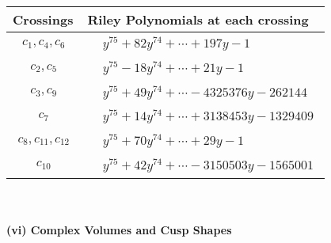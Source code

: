 \documentclass[1p]{elsarticle_modified}
\theoremstyle{definition}
\begin{document}
\begin{tabular}{m{50pt}|m{274pt}}
Crossings & \hspace{64pt}Riley Polynomials at each crossing \\
\hline $$\begin{aligned}c_{1},c_{4},c_{6}\end{aligned}$$&$\begin{aligned}
&y^{75}+82 y^{74}+\cdots+197 y-1
\end{aligned}$\\
\hline $$\begin{aligned}c_{2},c_{5}\end{aligned}$$&$\begin{aligned}
&y^{75}-18 y^{74}+\cdots+21 y-1
\end{aligned}$\\
\hline $$\begin{aligned}c_{3},c_{9}\end{aligned}$$&$\begin{aligned}
&y^{75}+49 y^{74}+\cdots-4325376 y-262144
\end{aligned}$\\
\hline $$\begin{aligned}c_{7}\end{aligned}$$&$\begin{aligned}
&y^{75}+14 y^{74}+\cdots+3138453 y-1329409
\end{aligned}$\\
\hline $$\begin{aligned}c_{8},c_{11},c_{12}\end{aligned}$$&$\begin{aligned}
&y^{75}+70 y^{74}+\cdots+29 y-1
\end{aligned}$\\
\hline $$\begin{aligned}c_{10}\end{aligned}$$&$\begin{aligned}
&y^{75}+42 y^{74}+\cdots-3150503 y-1565001
\end{aligned}$\\
\hline
\end{tabular}\\~\\
\newpage\flushleft \textbf{(vi) Complex Volumes and Cusp Shapes}
\end{document}
